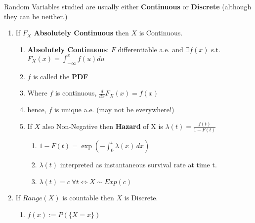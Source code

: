 \documentclass[a4paper,portrait,columns=2]{cheatsheet}
\begin{document}
Random Variables studied are usually either \textbf{Continuous} or \textbf{Discrete} (although they can be neither.)
\begin{enumerate}
	\item If \( F_X\) \textbf{Absolutely Continuous} then \(X\) is Continuous.
	\begin{enumerate}
		\item \textbf{Absolutely Continuous}: $F$ differentiable a.e. and $\exists f(x)$ s.t. $F_X(x) = \int_{-\infty}^{x} f(u) du$
		\item \(f\) is called the \textbf{PDF}
		\item Where $f$ is continuous, $\frac{d}{dx}F_X(x) = f(x)$
		\item hence, $f$ is unique a.e. (may not be everywhere!)
		\item If \(X\) also Non-Negative then \textbf{Hazard} of X is \( \lambda(t) = \frac{f(t)}{1 - F(t)}\)	
		\begin{enumerate}
			\item \(1 - F(t) = \exp\left(-\int_0^t \lambda(x)\,dx \right) \)
			\item \(\lambda(t)\) interpreted as instantaneous survival rate at time t.
			\item \( \lambda(t) = c \ \forall t \iff X \sim Exp(c) \)
		\end{enumerate}
	\end{enumerate}
	\item If \(Range(X)\) is countable then \(X\) is Discrete.
	\begin{enumerate}
		\item \(f(x):=P(\{X=x\})\)
	\end{enumerate}
\end{enumerate}
\end{document}
